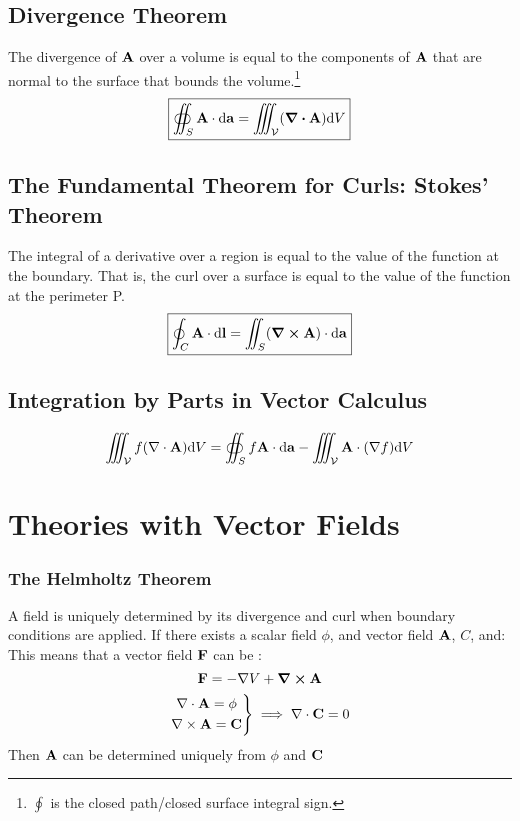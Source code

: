     \subsection*{Divergence Theorem}
        The divergence of \(\vb{A}\) over a volume is equal to the components of \(\vb{A}\) that are normal to the surface that bounds the volume.\footnote{\(\oint\) is the closed path/closed surface integral sign.}
        \begin{align}
            \boxed{\oiint_S \vb{A} \da =\iiint_{\mathcal{V}} (\div\vb{A})\d V } 
        \end{align}
    \subsection*{The Fundamental Theorem for Curls: Stokes' Theorem}
        The integral of a derivative over a region is equal to the value of the function at the boundary. That is, the curl over a surface is equal to the value of the function at the perimeter P. 
        \begin{align}
            \boxed{\oint_C \vb{A} \dl=\iint_{S} (\curl \vb{A}) \da} 
        \end{align}
        \subsection*{Integration by Parts in Vector Calculus}
        \begin{align*}
        \iiint_{\mathcal{V}} f(\nabla \cdot \vb{A})\d V 
        =
        \oiint_S f\vb{A}\da
        -\iiint_{\mathcal{V}} \vb{A} \cdot (\nabla f)\d V 
        \end{align*}


        \newpage

\section{Theories with Vector Fields \label{vectorfields}}
    \subsubsection*{The Helmholtz Theorem}
        A field is uniquely determined by its divergence and curl when boundary conditions are applied. If there exists a scalar field \(\phi\), and vector field \(\vb{A}\), \(C\), and:
        This means that a vector field \(\vb{F}\) can be :
        \begin{equation}
            \vb{F}=-\nabla V+\curl\vb{A}
        \end{equation}
        \begin{align*}
            \left.
            \begin{gathered}
            \nabla \cdot \vb{A}= \phi
            \\
            \nabla \times \vb{A}= \vb{C}
            \end{gathered}
            \right\}
            \implies
            \nabla \cdot \vb{C} = 0
        \end{align*}
        Then \(\vb{A}\) can be determined uniquely from $\phi$ and $\vb{C}$
